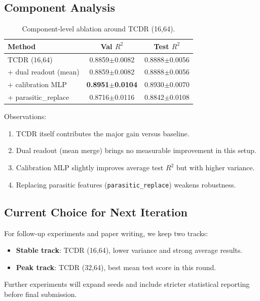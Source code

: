 \subsection{Component Analysis}
\begin{table}[htbp]
\centering
\small
\setlength{\tabcolsep}{3.5pt}
\begin{tabular}{lcc}
\toprule
Method & Val $R^2$ & Test $R^2$ \\
\midrule
TCDR (16,64) & 0.8859$\pm$0.0082 & 0.8888$\pm$0.0056 \\
+ dual readout (mean) & 0.8859$\pm$0.0082 & 0.8888$\pm$0.0056 \\
+ calibration MLP & \textbf{0.8951$\pm$0.0104} & 0.8930$\pm$0.0070 \\
+ parasitic\_replace & 0.8716$\pm$0.0116 & 0.8842$\pm$0.0108 \\
\bottomrule
\end{tabular}
\caption{Component-level ablation around TCDR (16,64).}
\label{tab:component_ablation}
\end{table}

Observations:
\begin{enumerate}
  \item TCDR itself contributes the major gain versus baseline.
  \item Dual readout (mean merge) brings no measurable improvement in this setup.
  \item Calibration MLP slightly improves average test $R^2$ but with higher variance.
  \item Replacing parasitic features (\texttt{parasitic\_replace}) weakens robustness.
\end{enumerate}

\subsection{Current Choice for Next Iteration}
For follow-up experiments and paper writing, we keep two tracks:
\begin{itemize}
  \item \textbf{Stable track}: TCDR (16,64), lower variance and strong average results.
  \item \textbf{Peak track}: TCDR (32,64), best mean test score in this round.
\end{itemize}
Further experiments will expand seeds and include stricter statistical reporting before final submission.
